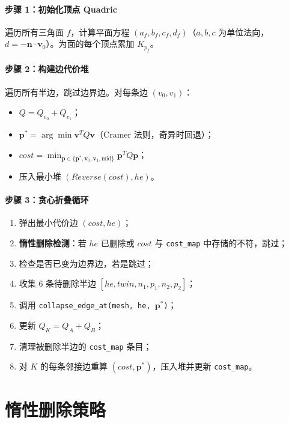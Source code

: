 \documentclass[11pt,a4paper]{article}
\begin{document}
\paragraph{步骤 1：初始化顶点 Quadric}
遍历所有三角面 $f$，计算平面方程 $(a_f, b_f, c_f, d_f)$（$a,b,c$ 为单位法向，
$d = -\mathbf{n} \cdot \mathbf{v}_0$）。为面的每个顶点累加 $K_{p_f}$。

\paragraph{步骤 2：构建边代价堆}
遍历所有半边，跳过边界边。对每条边 $(v_0, v_1)$：
\begin{itemize}
  \item $Q = Q_{v_0} + Q_{v_1}$；
  \item $\mathbf{p}^* = \arg\min \mathbf{v}^T Q \mathbf{v}$（Cramer 法则，奇异时回退）；
  \item $cost = \min_{\mathbf{p} \in \{\mathbf{p}^*, \mathbf{v}_0, \mathbf{v}_1, \text{mid}\}} \mathbf{p}^T Q \mathbf{p}$；
  \item 压入最小堆 $(Reverse(cost), he)$。
\end{itemize}

\paragraph{步骤 3：贪心折叠循环}
\begin{enumerate}
  \item 弹出最小代价边 $(cost, he)$；
  \item \textbf{惰性删除检测}：若 $he$ 已删除或 $cost$ 与 \texttt{cost\_map} 中存储的不符，跳过；
  \item 检查是否已变为边界边，若是跳过；
  \item 收集 6 条待删除半边 $[he, twin, n_1, p_1, n_2, p_2]$；
  \item 调用 \texttt{collapse\_edge\_at(mesh, he, $\mathbf{p}^*$)}；
  \item 更新 $Q_K = Q_A + Q_B$；
  \item 清理被删除半边的 \texttt{cost\_map} 条目；
  \item 对 $K$ 的每条邻接边重算 $(cost, \mathbf{p}^*)$，压入堆并更新 \texttt{cost\_map}。
\end{enumerate}

\section{惰性删除策略}
\end{document}
